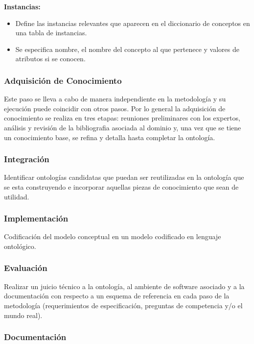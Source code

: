 \documentclass[a4paper,10pt,spanish,oneside]{article}
\begin{document}
\textbf{Instancias:}

\begin{itemize}
\item Define las instancias relevantes que aparecen en el diccionario de conceptos en una tabla de instancias.
\item Se especifica nombre, el nombre del concepto al que pertenece y valores de atributos si se conocen.
\end{itemize}

\subsubsection{Adquisición de Conocimiento}

Este paso se lleva a cabo de manera independiente en la metodología y su ejecución puede coincidir con otros pasos. Por lo general la adquisición de conocimiento se realiza en tres etapas: reuniones preliminares con los expertos, análisis y revisión de la bibliografia asociada al dominio y, una vez que se tiene un conocimiento base, se refina y detalla hasta completar la ontología.

\subsubsection{Integración}
Identificar ontologías candidatas que puedan ser reutilizadas en la ontología que se esta construyendo e incorporar aquellas piezas de conocimiento que sean de utilidad.

\subsubsection{Implementación}

Codificación del modelo conceptual en un modelo codificado en lenguaje ontológico.

\subsubsection{Evaluación}

Realizar un juicio técnico a la ontología, al ambiente de software asociado y a la documentación con respecto a un esquema de referencia en cada paso de la metodología (requerimientos de especificación, preguntas de competencia y/o el mundo real).

\subsubsection{Documentación}
\end{document}
